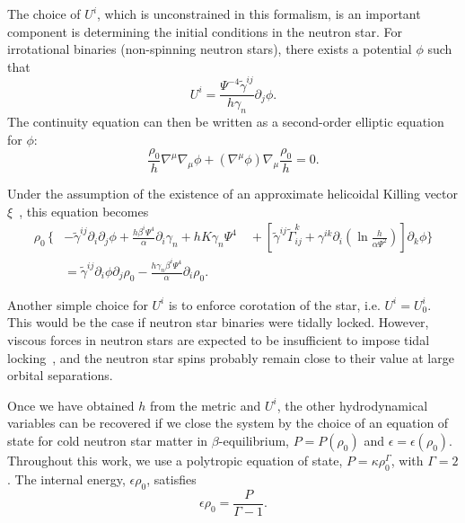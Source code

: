 The choice of $U^i$, which is unconstrained in this formalism, is an
important component is determining the initial conditions in the
neutron star. For irrotational binaries (non-spinning neutron stars),
there exists a potential $\phi$ such that
\begin{equation}
U^i = \frac{\Psi^{-4}\tilde{\gamma}^{ij}}{h\gamma_n}\partial_j\phi.
\end{equation}
The continuity equation can then be written as a second-order elliptic
equation for $\phi$:
\begin{equation}
\label{eq:Continuity}
\frac{\rho_0}{h}\nabla^{\mu}\nabla_{\mu}\phi +
\left(\nabla^{\mu}\phi\right)\nabla_{\mu}\frac{\rho_0}{h}=0.
\end{equation}

Under the assumption of the existence of an approximate helicoidal Killing vector $\xi$~\citep{Teukolsky:1998sh,Shibata:1998um}, this equation becomes
\begin{align}
\rho_0\,\bigg\{\!\!&-\tilde{\gamma}^{ij}\partial_i\partial_j\phi + 
\frac{h\beta^{i}\Psi^4}{\alpha}\partial_i\gamma_n+hK\gamma_n\Psi^4
\nonumber 
\quad+\left[\tilde{\gamma}^{ij}\tilde{\Gamma}^k_{ij}+\gamma^{ik}\partial_i\left(\ln\frac{h}{\alpha\Psi^2}\right)\right]\partial_k\phi 
\bigg\} \nonumber \\
&=
\tilde{\gamma}^{ij}\partial_i\phi\partial_j\rho_0-\frac{h\gamma_n\beta^i\Psi^4}{\alpha}\partial_i\rho_0. 
\label{eq:Continuity0}
\end{align}

Another simple choice for $U^i$ is to enforce corotation of the star,
i.e. $U^i=U^i_0$. This would be the case if neutron star binaries were
tidally locked. However, viscous forces in neutron stars are expected
to be insufficient to impose tidal locking~\citep{BildstenCutler1992},
and the neutron star spins probably remain close to their value at
large orbital separations.

Once we have obtained $h$ from the metric and $U^i$, the other
hydrodynamical variables can be recovered if we close the system by the
choice of an equation of state for cold neutron star matter in
$\beta$-equilibrium, $P = P(\rho_0)$ and $\epsilon=\epsilon(\rho_0)$.
Throughout this work, we use a polytropic equation of state, $P=\kappa\rho_0^\Gamma$, with $\Gamma=2$. The internal energy, $\epsilon\rho_0$, satisfies 
\begin{equation}
\epsilon\rho_0=\frac{P}{\Gamma-1}.
\end{equation}

